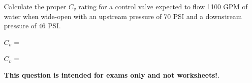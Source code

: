 

Calculate the proper $C_v$ rating for a control valve expected to flow 1100 GPM of water when wide-open with an upstream pressure of 70 PSI and a downstream pressure of 46 PSI.

\vskip 10pt

$C_v$ = \underbar{\hskip 50pt}







$C_v$ = 







{\bf This question is intended for exams only and not worksheets!}.



